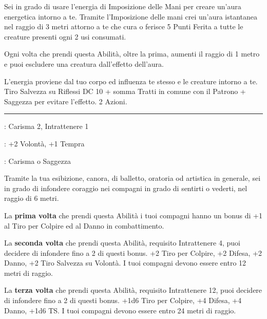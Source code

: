 \begin{multicols}{2}
Sei in grado di usare l'energia di Imposizione delle Mani per creare un'aura energetica intorno a te.
Tramite l'Imposizione delle mani crei un'aura istantanea nel raggio di 3 metri attorno a te che cura o ferisce 5 Punti Ferita a tutte le creature presenti ogni 2 usi consumati.

Ogni volta che prendi questa Abilità, oltre la prima, aumenti il raggio di 1 metro e puoi escludere una creatura dall'effetto dell'aura.

L'energia proviene dal tuo corpo ed influenza te stesso e le creature intorno a te. Tiro Salvezza su Riflessi DC 10 + somma Tratti in comune con il Patrono + Saggezza per evitare l'effetto.  2 Azioni.


%

\smallskip\noindent\rule{\linewidth}{2pt} \hypertarget{Infondere Coraggio}{}\medskip{}
\noindent
\begin{description}[noitemsep, topsep=0pt, parsep=0pt, partopsep=0pt, leftmargin=0cm, labelwidth=2.5cm]
    \item[\textbf{Requisito}]: Carisma 2, Intrattenere 1
    \item[\textbf{Tiri Salvezza}]: +2 Volontà, +1 Tempra
    \item[\textbf{Caratteristica}]: Carisma o Saggezza
\end{description}

Tramite la tua esibizione, canora, di balletto, oratoria od artistica in generale, sei in grado di infondere coraggio nei compagni in grado di sentirti o vederti, nel raggio di 6 metri.

La \textbf{prima volta} che prendi questa Abilità i tuoi compagni hanno un bonus di +1 al Tiro per Colpire ed al Danno in combattimento.

La \textbf{seconda volta} che prendi questa Abilità, requisito Intrattenere 4, puoi decidere di infondere fino a 2 di questi bonus. +2 Tiro per Colpire, +2 Difesa, +2 Danno, +2 Tiro Salvezza su Volontà. I tuoi compagni devono essere entro 12 metri di raggio.

La \textbf{terza volta} che prendi questa Abilità, requisito Intrattenere 12, puoi decidere di infondere fino a 2 di questi bonus. +1d6 Tiro per Colpire, +4 Difesa, +4 Danno, +1d6 TS. I tuoi compagni devono essere entro 24 metri di raggio.


\end{multicols}
